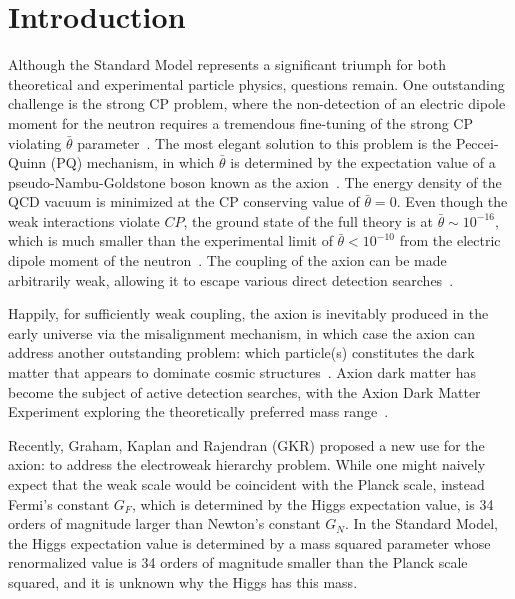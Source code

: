 \documentclass[12pt,aps,prd,showpacs,notitlepage,nofootinbib]{revtex4-1}
\begin{document}
\section{Introduction} 
Although the Standard Model represents a significant triumph for both theoretical and experimental particle physics, questions remain. One outstanding challenge is the strong CP problem, where the non-detection of an electric dipole moment for the neutron requires a tremendous fine-tuning of the strong CP violating $\bar{\theta}$ parameter~\cite{Belavin:1975fg,Jackiw:1976pf,Callan:1976je}. The most elegant solution to this problem is the Peccei-Quinn (PQ) mechanism, in which $\bar{\theta}$  is determined by the expectation value of a pseudo-Nambu-Goldstone boson known as the axion~\cite{Peccei:1977hh,Weinberg:1977ma,Wilczek:1977pj}. The  energy density  of the QCD vacuum is minimized at  the CP conserving value of $\bar{\theta}=0$. Even though the weak interactions violate $CP$, the ground state of the full theory is at  $\bar{\theta}\sim 10^{-16}$,~\cite{Ellis:1978hq} which is much smaller than the experimental limit of $\bar{\theta}<10^{-10}$  from the electric dipole moment of the neutron~\cite{Crewther:1979pi,Georgi:1986df,Dubbers:2011ns}. The coupling of the axion can be made arbitrarily weak, allowing it to escape various direct detection searches~\cite{Kim:1979if,Zhitnitsky:1980tq,Dine:1981rt}. 

Happily, for sufficiently weak coupling, the axion is inevitably produced in the early universe via the misalignment mechanism, in which case the axion can address another outstanding problem: which particle(s) constitutes the dark matter that appears to dominate cosmic structures~\cite{Abbott:1982af,Preskill:1982cy,Dine:1982ah}. Axion dark matter has become the subject of active detection searches, with the Axion Dark Matter Experiment exploring the theoretically preferred mass range~\cite{Sikivie:1983ip,Asztalos:2009yp,Rosenberg:2015kxa,Stern:2016bbw}.  

Recently, Graham, Kaplan and Rajendran (GKR) \cite{Graham:2015cka} proposed a new use for the axion: to address the electroweak hierarchy problem. While one might naively expect that the weak scale would be coincident with the Planck scale, instead Fermi's constant $G_F$, which is determined by the Higgs expectation value, is 34 orders of magnitude larger than Newton's constant $G_N$. In the Standard Model, the Higgs expectation value is determined by a mass squared parameter whose renormalized value is 34 orders of magnitude smaller than the Planck scale squared, and it is unknown why the Higgs has this mass.
 
\end{document}
